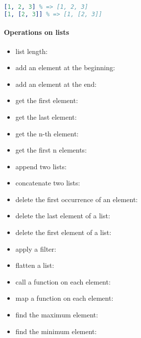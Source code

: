 \documentclass[a4paper,landscape,10pt]{article}
\begin{document}
\begin{multicols*}{2}
  \begin{lstlisting}[language=Erlang]
[1, 2, 3] % => [1, 2, 3]
[1, [2, 3]] % => [1, [2, 3]]
\end{lstlisting}

  \breakcolumn

  \paragraph{Operations on lists}

  \begin{itemize}
    \item list length: 
    \item add an element at the beginning: 
    \item add an element at the end: 
    \item get the first element: 
    \item get the last element: 
    \item get the n-th element: 
    \item get the first n elements: 
    \item append two lists: 
    \item concatenate two lists: 

    \item delete the first occurrence of an element: 
    \item delete the last element of a list: 
    \item delete the first element of a list: 
    \item apply a filter: 
    \item flatten a list: 

    \item call a function on each element: 
    \item map a function on each element: 
    \item find the maximum element: 
    \item find the minimum element: 
  \end{itemize}


\end{multicols*}
\end{document}

